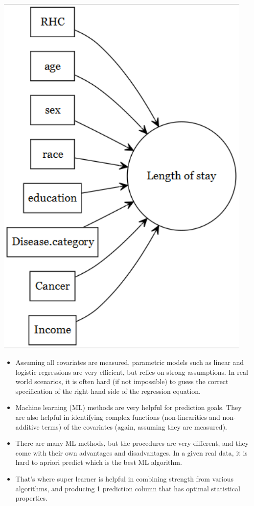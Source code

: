\documentclass[
]{book}
\providecommand{\tightlist}{%
  \setlength{\itemsep}{0pt}\setlength{\parskip}{0pt}}
\begin{document}
\includegraphics[width=5.01in]{images/dagpred}

\begin{itemize}
\tightlist
\item
  Assuming all covariates are measured, parametric models such as linear and logistic regressions are very efficient, but relies on strong assumptions. In real-world scenarios, it is often hard (if not impossible) to guess the correct specification of the right hand side of the regression equation.
\item
  Machine learning (ML) methods are very helpful for prediction goals. They are also helpful in identifying complex functions (non-linearities and non-additive terms) of the covariates (again, assuming they are measured).
\item
  There are many ML methods, but the procedures are very different, and they come with their own advantages and disadvantages. In a given real data, it is hard to apriori predict which is the best ML algorithm.
\item
  That's where super learner is helpful in combining strength from various algorithms, and producing 1 prediction column that has optimal statistical properties.
\end{itemize}
\end{document}
